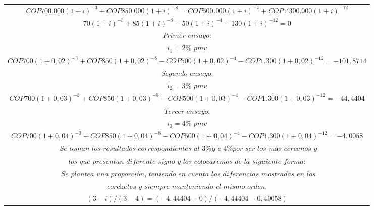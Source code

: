 \begin{center}
\begin{longtable}[H]{|c|c|c|}
    \multicolumn{3}{|c|}{$  COP  700.000(1+i)^{-3}  +  COP  850.000(1+i)^{-8} =  COP  500.000(1+i)^{-4} +  COP  1'300.000(1+i)^{-12}$}      \\
    \multicolumn{3}{|c|}{$ 70(1+i)^{-3} +85(1+i)^{-8} - 50(1+i)^{-4} - 130(1+i)^{-12} = 0   $ }                                             \\
    \multicolumn{3}{|c|}{$ \textit{Primer ensayo:} $ }                                                                                      \\
    \multicolumn{3}{|c|}{$ i_{1} = 2\% \textit{ pmv} $ }                                                                                    \\
    \multicolumn{3}{|c|}{$  COP 700(1+0,02)^{-3} +  COP 850(1+0,02)^{-8} -  COP 500(1+0,02)^{-4} -  COP 1.300(1+0,02)^{-12} = -101,8714 $ } \\
    \multicolumn{3}{|c|}{$ \textit{Segundo ensayo:} $ }                                                                                     \\
    \multicolumn{3}{|c|}{$ i_{2} = 3\% \textit{ pmv} $ }                                                                                    \\
    \multicolumn{3}{|c|}{$  COP 700(1+0,03)^{-3} + COP 850(1+0,03)^{-8} -  COP 500(1+0,03)^{-4} -  COP 1.300(1+0,03)^{-12} = -44,4404 $ }   \\
    \multicolumn{3}{|c|}{$ \textit{Tercer ensayo:} $ }                                                                                      \\
    \multicolumn{3}{|c|}{$ i_{3} = 4\% \textit{ pmv} $ }                                                                                    \\
    \multicolumn{3}{|c|}{$  COP 700(1+0,04)^{-3} + COP 850(1+0,04)^{-8} - COP 500(1+0,04)^{-4} -  COP 1.300(1+0,04)^{-12} = -4,0058 $ }     \\
    \multicolumn{3}{|c|}{$ 	\textit{ Se toman los resultados correspondientes al 3\% y a 4\% por ser los más cercanos y} $ }                 \\
    \multicolumn{3}{|c|}{$ 	\textit{los que presentan diferente signo y los colocaremos de la siguiente forma:} $ }                          \\
    \multicolumn{3}{|c|}{$ \textit{ Se plantea una proporción, teniendo en cuenta las diferencias mostradas en los} $ }                     \\
    \multicolumn{3}{|c|}{$ \textit{corchetes y siempre manteniendo el mismo orden.} $ }                                                     \\
    \multicolumn{3}{|c|}{$ (3-i)/(3-4) = (-4,44404-0)/(-4,44404-0,40058) $ }                                                                \\ \hline



\end{longtable}
\end{center}
